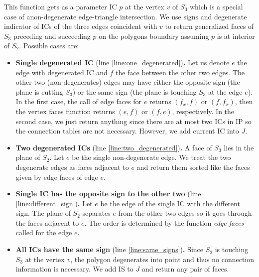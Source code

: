 \documentclass{elsarticle}
\begin{document}
This function gets as a parameter IC $p$ at the vertex $v$ of $S_3$ which is a special case of anon-degenerate edge-triangle intersection. 
We use signs and degenerate indicator of ICs of the three edges coincident with $v$ to return generalized faces of $S_3$ 
preceding and succeeding $p$ on the polygons boundary assuming $p$ is at interior of $S_2$.
Possible cases are:
\begin{itemize}
 \item {\bf Single degenerated IC} (line \ref{line:one_degenerated}){\bf .} Let us denote $e$ the edge with degenerated IC 
 and $f$ the face between the other two edges.
 The other two (non-degenerates) edges may have either the opposite sign (the plane is cutting $S_3$) 
 or the same sign (the plane is touching $S_3$ at the edge $e$).
 In the first case, the call of edge faces for $e$ returns $(f_x,f)$ or $(f,f_x)$, then the vertex faces function returns $(e, f)$ or $(f, e)$, respectively.
 In the second case, we just return anything since there are at most two ICs in IP so the connection tables are not necessary. However, we add 
 current IC into $J$.
 
 \item {\bf Two degenerated ICs} (line \ref{line:two_degenerated}){\bf .} A face of $S_3$ lies in the plane of $S_2$. 
 Let $e$ be the single non-degenerate edge. We treat the two degenerate edges as faces adjacent to $e$ 
 and return them sorted like the faces given by edge faces of edge $e$.
 
 
 \item {\bf Single IC has the opposite sign to the other two} (line \ref{line:different_sign}){\bf .} 
 Let $e$ be the edge of the single IC with the different sign. 
 The plane of $S_2$ separates $e$ from the other two edges so it goes through the faces adjacent to $e$. 
 The order is determined by the function \emph{edge faces} called for the edge $e$.

 \item {\bf All ICs have the same sign} (line \ref{line:same_signs}){\bf .} Since $S_2$ is touching $S_3$ 
 at the vertex $v$, the polygon degenerates into point and thus no connection information is necessary. We add IS to $J$ and return any pair of faces.
\end{itemize}
\end{document}
